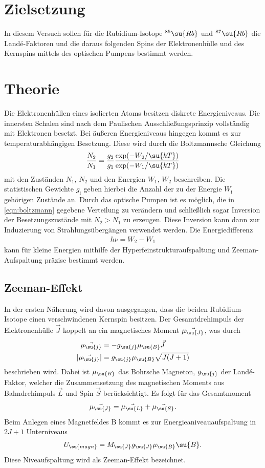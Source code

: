 \section{Zielsetzung}
In diesem Versuch sollen für die Rubidium-Isotope $^{85}\su{Rb}$ und $^{87}\su{Rb}$ die Landé-Faktoren und die
daraus folgenden Spins der Elektronenhülle und des Kernspins mittels des optischen Pumpens bestimmt werden.
\section{Theorie}
Die Elektronenhüllen eines isolierten Atoms besitzen diskrete Energieniveaus. Die innersten Schalen sind nach dem Paulischen Ausschließungsprinzip
vollständig mit Elektronen besetzt. Bei äußeren Energieniveaus hingegen kommt es
zur temperaturabhängigen Besetzung. Diese wird durch die Boltzmannsche Gleichung
\begin{align}
    \frac{N_{2}}{N_{1}} = \frac{g_{2}}{g_{1}}\frac{\exp(-W_{2}/\su{kT})}{\exp(-W_{1}/\su{kT})}
    \label{eqn:boltzmann}
\end{align}
mit den Zuständen $N_1$, $N_2$ und den Energien $W_1$, $W_2$
beschreiben. Die statistischen Gewichte $g_{\text{i}}$ geben hierbei die Anzahl der zu der Energie
$W_{\text{i}}$ gehörigen Zustände an.
Durch das optische Pumpen ist es möglich, die in \ref{eqn:boltzmann} gegebene Verteilung
zu verändern und schließlich sogar Inversion der Besetzungszustände mit $N_2 > N_1$ zu erzeugen.
Diese Inversion kann dann zur Induzierung von Strahlungsübergängen verwendet werden.
Die Energiedifferenz
\begin{align*}
    h\nu = W_{2}-W_{1}
\end{align*}
kann für kleine Energien mithilfe der Hyperfeinstrukturaufspaltung und
Zeeman-Aufspaltung präzise bestimmt werden.

\subsection{Zeeman-Effekt}
In der ersten Näherung wird davon ausgegangen, dass die beiden Rubidium-Isotope einen verschwindenen
Kernspin besitzen. Der Gesamtdrehimpuls der Elektronenhülle $\vec{J}$ koppelt an ein
magnetisches Moment $\vec{\mu_{\su{J}}}$, was durch
\begin{align*}
    \vec{\mu_{\su{j}}} &= -g_{\su{j}} \mu_{\su{B}} \vec{J} \\
    |\vec{\mu_{\su{j}}}| &= g_{\su{j}} \mu_{\su{B}} \sqrt{J(J+1)}
\end{align*}
beschrieben wird. Dabei ist $\mu_{\su{B}}$ das Bohrsche Magneton, $g_{\su{j}}$ der Landé-Faktor, welcher
die Zusammensetzung des magnetischen Moments aus Bahndrehimpuls $\vec{L}$ und Spin $\vec{S}$ berücksichtigt.
Es folgt für das Gesamtmoment
\begin{align*}
    \vec{\mu_{\su{J}}} = \vec{\mu_{\su{L}}} + \vec{\mu_{\su{S}}}.
\end{align*}
Beim Anlegen eines Magnetfeldes B kommt es zur Energieaniveauaufspaltung in $2J+1$ Unterniveaus
\begin{align*}
    U_{\su{magn}} = M_{\su{J}} g_{\su{J}} \mu_{\su{B}} \su{B}.
\end{align*}
Diese Niveaufspaltung wird als Zeeman-Effekt bezeichnet.

